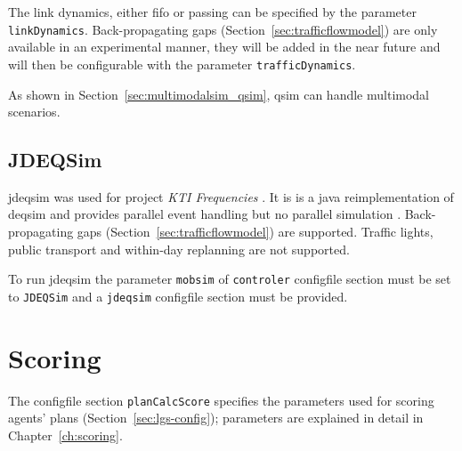 The link dynamics, either \gls{fifo} or passing can be specified by the parameter \lstinline|linkDynamics|. 
Back-propagating gaps (Section~\ref{sec:trafficflowmodel}) are only available in an experimental manner, 
they will be added in the near future and will then be configurable with the parameter \lstinline|trafficDynamics|. 

As shown in Section~\ref{sec:multimodalsim_qsim}, \gls{qsim} can handle \gls{multimodal} scenarios. 


\subsection{JDEQSim}
\label{sec:using-jdeqsim}
\gls{jdeqsim} \citep[][]{WaraichEtAl_TechRep_IVT_2009, WaraichEtAl_STRC_2009} was used for project \emph{KTI Frequencies} \citep[][]{BalmerEtAl_ResRep_datapuls_2010}. It is is a \gls{java} reimplementation of \gls{deqsim} \citep[][]{WaraichEtAl_STRC_2009, CharyparEtAl_TRR_2007, CharyparEtAl_TRB_2009} and provides parallel event handling but no parallel simulation \citep[][p.11]{BalmerEtAl_ResRep_datapuls_2010}. Back-propagating gaps (Section~\ref{sec:trafficflowmodel}) are supported. Traffic lights, public transport and within-day replanning are not supported.

To run \gls{jdeqsim} the parameter \lstinline|mobsim| of \lstinline|controler| \gls{configfile} section must be set to \lstinline|JDEQSim| and a \lstinline|jdeqsim| \gls{configfile} section must be provided. 

\section{Scoring}
\label{sec:using-scoring}
The \gls{configfile} section \lstinline|planCalcScore| specifies the parameters used for scoring agents' plans (Section~\ref{sec:lgs-config}); parameters are explained in detail in Chapter~\ref{ch:scoring}.

